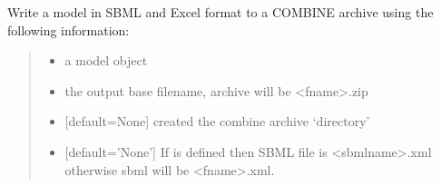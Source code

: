 \documentclass[letterpaper,12pt,english]{sphinxmanual}
\begin{document}
\begin{fulllineitems}

\pysigstartsignatures
\pysiglinewithargsret
{}
{\sphinxparamcomma {}\sphinxparamcomma {}\sphinxparamcomma {}\sphinxparamcomma {}\sphinxparamcomma {}\sphinxparamcomma {}\sphinxparamcomma {}\sphinxparamcomma {}\sphinxparamcomma {}\sphinxparamcomma {}}
{}
\pysigstopsignatures
\sphinxAtStartPar
Write a model in SBML and Excel format to a COMBINE archive using the following information:
\begin{quote}\begin{description}
\begin{itemize}
\item {} 
\sphinxAtStartPar
{} \textendash{} a model object

\item {} 
\sphinxAtStartPar
{} \textendash{} the output base filename, archive will be \textless{}fname\textgreater{}.zip

\item {} 
\sphinxAtStartPar
{} \textendash{} {[}default=None{]} created the combine archive ‘directory’

\item {} 
\sphinxAtStartPar
{} \textendash{} {[}default=’None’{]} If  is defined then SBML file is \textless{}sbmlname\textgreater{}.xml otherwise sbml will be \textless{}fname\textgreater{}.xml.


\end{itemize}
\end{description}
\end{quote}
\end{fulllineitems}
\end{document}
